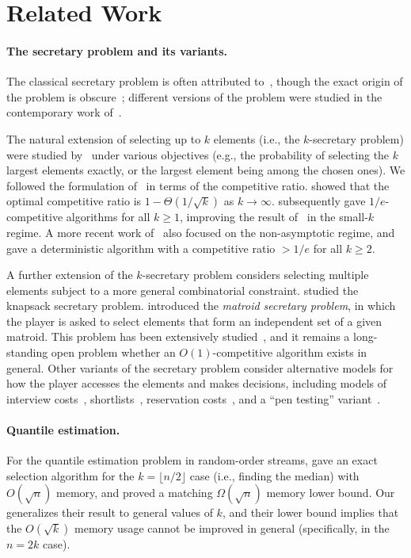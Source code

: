 \section{Related Work}
\paragraph{The secretary problem and its variants.} 
The classical secretary problem is often attributed to~\cite{dynkin1963optimum}, though the exact origin of the problem is obscure~\cite{freeman1983secretary,Ferguson1989}; different versions of the problem were studied in the contemporary work of~\cite{Lindley61,CMRS64,GM66}. 

The natural extension of selecting up to $k$ elements (i.e., the $k$-secretary problem) were studied by~\cite{GM66,AMW01,Kleinberg05,BIKK07} under various objectives (e.g., the probability of selecting the $k$ largest elements exactly, or the largest element being among the chosen ones). We followed the formulation of~\cite{Kleinberg05} in terms of the competitive ratio. \cite{Kleinberg05} showed that the optimal competitive ratio is $1 - \Theta(1/\sqrt{k})$ as $k \to \infty$. \cite{BIKK07} subsequently gave $1/e$-competitive algorithms for all $k \ge 1$, improving the result of~\cite{Kleinberg05} in the small-$k$ regime. A more recent work of~\cite{AL21} also focused on the non-asymptotic regime, and gave a deterministic algorithm with a competitive ratio $> 1/e$ for all $k \ge 2$.

A further extension of the $k$-secretary problem considers selecting multiple elements subject to a more general combinatorial constraint. \cite{BIKK07} studied the knapsack secretary problem. \cite{BIK07,BIKK18} introduced the \emph{matroid secretary problem}, in which the player is asked to select elements that form an independent set of a given matroid. This problem has been extensively studied~\cite{chakraborty2012improved,soto2013matroid,jaillet2013advances,dinitz2014matroid,lachish2014log, feldman2014simple,huynh2020matroid,soto2021strong,AKKO23}, and it remains a long-standing open problem whether an $O(1)$-competitive algorithm exists in general. Other variants of the secretary problem consider alternative models for how the player accesses the elements and makes decisions, including models of interview costs~\cite{bartoszynski1978secretary}, shortlists~\cite{ASS19}, reservation costs~\cite{burjons2021secretary}, and a ``pen testing'' variant~\cite{QV23,ganesh2023combinatorial}.

\paragraph{Quantile estimation.} For the quantile estimation problem in random-order streams, \cite{MP80} gave an exact selection algorithm for the $k = \lfloor n/2\rfloor$ case (i.e., finding the median) with $O(\sqrt{n})$ memory, and proved a matching $\Omega(\sqrt{n})$ memory lower bound. Our  generalizes their result to general values of $k$, and their lower bound implies that the $O(\sqrt{k})$ memory usage cannot be improved in general (specifically, in the $n = 2k$ case).

